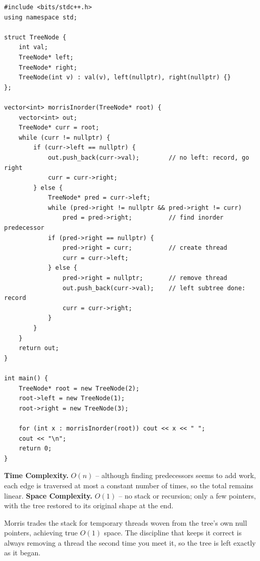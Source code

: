 \begin{lstlisting}
#include <bits/stdc++.h>
using namespace std;

struct TreeNode {
    int val;
    TreeNode* left;
    TreeNode* right;
    TreeNode(int v) : val(v), left(nullptr), right(nullptr) {}
};

vector<int> morrisInorder(TreeNode* root) {
    vector<int> out;
    TreeNode* curr = root;
    while (curr != nullptr) {
        if (curr->left == nullptr) {
            out.push_back(curr->val);        // no left: record, go right
            curr = curr->right;
        } else {
            TreeNode* pred = curr->left;
            while (pred->right != nullptr && pred->right != curr)
                pred = pred->right;          // find inorder predecessor
            if (pred->right == nullptr) {
                pred->right = curr;          // create thread
                curr = curr->left;
            } else {
                pred->right = nullptr;       // remove thread
                out.push_back(curr->val);    // left subtree done: record
                curr = curr->right;
            }
        }
    }
    return out;
}

int main() {
    TreeNode* root = new TreeNode(2);
    root->left = new TreeNode(1);
    root->right = new TreeNode(3);

    for (int x : morrisInorder(root)) cout << x << " ";
    cout << "\n";
    return 0;
}
\end{lstlisting}

\begin{complexitybox}
\textbf{Time Complexity.} $O(n)$ -- although finding predecessors seems to
add work, each edge is traversed at most a constant number of times, so
the total remains linear. \textbf{Space Complexity.} $O(1)$ -- no stack or
recursion; only a few pointers, with the tree restored to its original
shape at the end.
\end{complexitybox}

\begin{takeawaybox}
Morris trades the stack for temporary threads woven from the tree's own
null pointers, achieving true $O(1)$ space. The discipline that keeps it
correct is always removing a thread the second time you meet it, so the
tree is left exactly as it began.
\end{takeawaybox}
